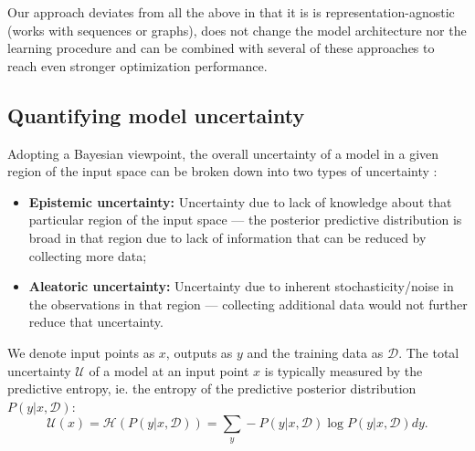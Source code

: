 Our approach deviates from all the above in that it is is representation-agnostic (works with sequences or graphs), does not change the model architecture nor the learning procedure and can be combined with several of these approaches to reach even stronger optimization performance.

\subsection{Quantifying model uncertainty}
\label{Sec2_Background_Uncertainty}
Adopting a Bayesian viewpoint, the overall uncertainty of a model in a given region of the input space can be broken down into two types of uncertainty \citep{kendall2017uncertainties}:
\begin{itemize}
    \item \textbf{Epistemic uncertainty:} Uncertainty due to lack of knowledge about that particular region of the input space --- the posterior predictive distribution is broad in that region due to lack of information that can be reduced by collecting more data;
    \item \textbf{Aleatoric uncertainty:} Uncertainty due to inherent stochasticity/noise in the observations in that region --- collecting additional data would not further reduce that uncertainty.
\end{itemize}

We denote input points as $x$, outputs as $y$ and the training data as $\mathcal{D}$. The total uncertainty $\mathcal{U}$ of a model at an input point $x$ is typically measured by the predictive entropy, ie. the entropy of the predictive posterior distribution $P(y|x,\mathcal{D})$:
\begin{equation}
\mathcal{U}(x) = \mathcal{H}(P(y|x,\mathcal{D})) = \sum_{y} - P(y|x,\mathcal{D}) \log P(y|x,\mathcal{D}) dy.
\end{equation}

